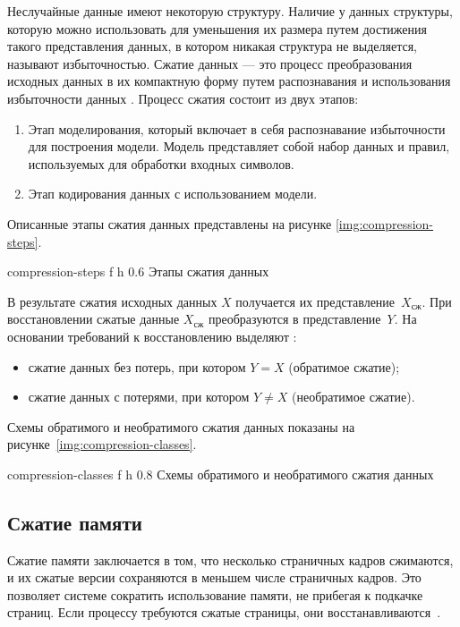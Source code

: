 Неслучайные данные имеют некоторую структуру. Наличие у данных структуры, которую можно использовать для уменьшения их размера путем достижения такого представления данных, в котором никакая структура не выделяется, называют избыточностью. Сжатие данных --- это процесс преобразования исходных данных в их компактную форму путем распознавания и использования избыточности данных \cite{compression-definition}. Процесс сжатия состоит из двух этапов:

\begin{enumerate}
	\item Этап моделирования, который включает в себя распознавание избыточности для построения модели. Модель представляет собой набор данных и правил, используемых для обработки входных символов.
	\item Этап кодирования данных с использованием модели.
\end{enumerate}

Описанные этапы сжатия данных представлены на рисунке \ref{img:compression-steps}.

    {compression-steps}
    {f}
    {h}
    {0.6\textwidth}
    {Этапы сжатия данных}

В результате сжатия исходных данных $X$ получается их представление~$X_{\text{сж}}$. При восстановлении сжатые данные $X_{\text{сж}}$ преобразуются в представление~$Y$. На основании требований к восстановлению выделяют \cite{compression-classes}:

\begin{itemize}
	\item сжатие данных без потерь, при котором $Y = X$ (обратимое сжатие);
	\item сжатие данных с потерями, при котором $Y \not= X$ (необратимое сжатие).
\end{itemize}

Схемы обратимого и необратимого сжатия данных показаны на рисунке~\ref{img:compression-classes}.

    {compression-classes}
    {f}
    {h}
    {0.8\textwidth}
    {Схемы обратимого и необратимого сжатия данных}

\subsection{Сжатие памяти}

Сжатие памяти заключается в том, что несколько страничных кадров сжимаются, и их сжатые версии сохраняются в меньшем числе страничных кадров. Это позволяет системе сократить использование памяти, не прибегая к подкачке страниц. Если процессу требуются сжатые страницы, они восстанавливаются~\cite{swapping}.

